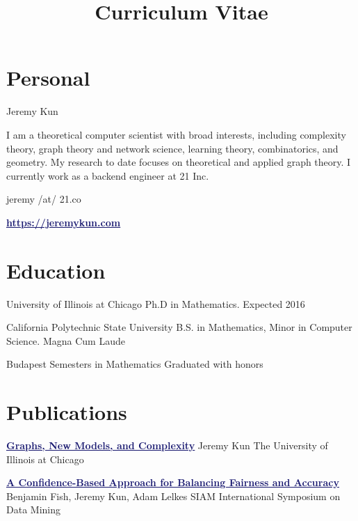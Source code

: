 \documentclass[11pt]{moderncv}
\title{Curriculum Vitae}
\begin{document}
   \maketitle

      \section{Personal}
         {Jeremy Kun}

         {I am a theoretical computer scientist with broad interests, including complexity theory, graph theory and network science, learning theory, combinatorics, and geometry. My research to date focuses on theoretical and applied graph theory. I currently work as a backend engineer at 21 Inc.}

         {jeremy /at/ 21.co}

         {\href{https://jeremykun.com}{\textcolor{MidnightBlue}{\underline{\textbf{https://jeremykun.com}}}}}


   \section{Education}
         {University of Illinois at Chicago}
      {}
      {Ph.D in Mathematics.}
      {Expected 2016}
      {}

         {California Polytechnic State University}
      {}
      {B.S. in Mathematics, Minor in Computer Science.}
      {Magna Cum Laude}
      {}

         {Budapest Semesters in Mathematics}
      {}
{}
      {Graduated with honors}
      {}


   \section{Publications}
         {\href{http://www.levreyzin.com/papers/Kun16_phd.pdf}{\textcolor{MidnightBlue}{\underline{\textbf{Graphs, New Models, and Complexity}}}}}
      {Jeremy Kun}
      {The University of Illinois at Chicago}
      {}
      {}

         {\href{}{\textcolor{MidnightBlue}{\underline{\textbf{A Confidence-Based Approach for Balancing Fairness and Accuracy}}}}}
      {Benjamin Fish, Jeremy Kun, Adam Lelkes}
      {SIAM International Symposium on Data Mining}
      {}
      {}
\end{document}
